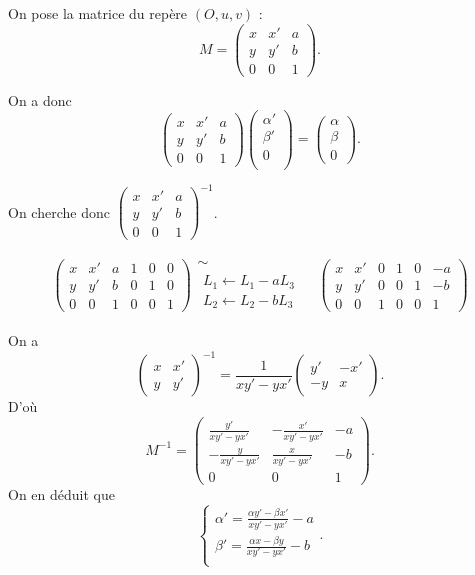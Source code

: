 On pose la matrice du repère $(O, u, v)$ :  \[
	M = \begin{pmatrix}
		x&x'&a\\
		y&y'&b\\
		0&0&1
	\end{pmatrix} 
.\]

On a donc \[
	\begin{pmatrix}
		x&x'&a\\
		y&y'&b\\
		0&0&1
	\end{pmatrix} \begin{pmatrix}
		\alpha'\\
		\beta'\\
		0\\
	\end{pmatrix} = \begin{pmatrix}
		\alpha\\
		\beta\\
		0
	\end{pmatrix}
.\]

On cherche donc $\begin{pmatrix}
	x&x'&a\\
	y&y'&b\\
	0&0&1
\end{pmatrix}^{-1}$.

\begin{align*}
	\left(
		\begin{array}{ccc|ccc}
			x&x'&a&1&0&0\\
			y&y'&b&0&1&0\\
			0&0&1&0&0&1
		\end{array}
	\right)
	\begin{array}{c}
		\sim\\
		\substack{L_1 \leftarrow L_1 - aL_3\\L_2\leftarrow L_2-bL_3}
	\end{array}&
	\left(
		\begin{array}{ccc|ccc}
			x&x'&0&1&0&-a\\
			y&y'&0&0&1&-b\\
			0&0&1&0&0&1
		\end{array}
	\right)
\end{align*}

On a \[
	\begin{pmatrix}
		x&x'\\
		y&y'
	\end{pmatrix}^{-1} = \frac{1}{xy'-yx'} \begin{pmatrix}
		y'&-x'\\
		-y&x
	\end{pmatrix}
.\] D'où \[
	M^{-1} = \begin{pmatrix}
		\frac{y'}{xy' - yx'}&-\frac{x'}{xy' - yx'}&-a\\
		-\frac{y}{xy'-yx'}&\frac{x}{xy'-yx'}&-b\\
		0&0&1
	\end{pmatrix} 
.\] On en déduit que \[
	\begin{cases}
		\alpha' = \frac{\alpha y' - \beta x'}{xy' - yx'} - a\\[2mm]
		\beta' = \frac{\alpha x - \beta y}{xy' - yx'} - b\\
	\end{cases}
.\]
